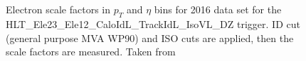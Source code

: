 \begin{figure}
\centering
{} \\
 \\
\caption{Electron scale factors in $p_{T}$ and $\eta$ bins for 2016 data set for the HLT\_Ele23\_Ele12\_CaloIdL\_TrackIdL\_IsoVL\_DZ trigger. ID cut (general purpose MVA WP90) and ISO cuts are applied, then the scale factors are measured. Taken from ~\cite{vhbbAN}}
\label{fig:trigger_eff_diele}
\end{figure}


